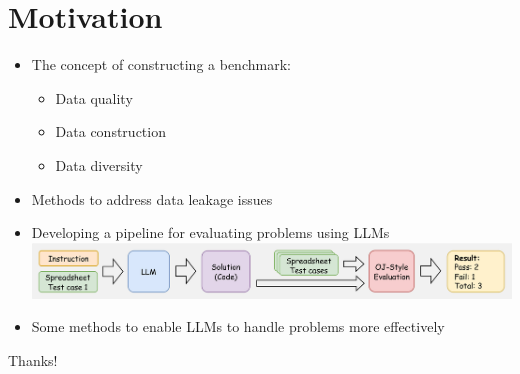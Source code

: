 \documentclass{beamer}
\begin{document}
\section{Motivation}

\begin{frame}
    \begin{itemize}
        \item The concept of constructing a benchmark:
        \begin{itemize}
            \item Data quality
            \item Data construction
            \item Data diversity
        \end{itemize}
        \item Methods to address data leakage issues
        \item Developing a pipeline for evaluating problems using LLMs
        \includegraphics[width=1\linewidth]{pic/OJ Evaluation pipeline.jpg}
        \item Some methods to enable LLMs to handle problems more effectively
    \end{itemize}
\end{frame}

\begin{frame}
    \begin{center}
        {\Huge\calligra Thanks!}
    \end{center}
\end{frame}
\end{document}
